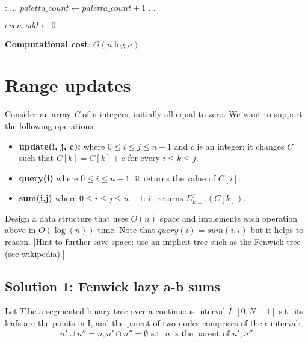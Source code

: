 \documentclass{article}
\begin{document}
\begin{algorithmic}[1]
  :
    \State ...                        
      \State $paletta\_count \gets paletta\_count + 1$
      \State ...
      \EndIf
    \EndFunction
\end{algorithmic}

\begin{algorithmic}[1]
    \State $even, odd \gets 0$
        \State {}\;
      \EndIf
    \EndFor
    \State {}\;
    \EndFunction
\end{algorithmic}

\begin{framed}
  \noindent
  \textbf{Computational cost}: $\Theta(n\log n)$.
\end{framed}


\newpage
\section{Range updates}

Consider an array \emph{C} of n integers, initially all equal to zero.
We want to support the following operations:
\begin{itemize}
    \item \textbf{update(i, j, c):} where $0 \leq i \leq j \leq n - 1$ and $c$ is
    an integer: it changes $C$ such that $C[k] = C[k] + c$ for every $i \leq k \leq j$.
    \item \textbf{query(i)} where $0 \leq i \leq n - 1$: it returns the value of $C[i]$.
    \item \textbf{sum(i,j)} where $0 \leq i \leq j \leq n - 1$: it returns
                    $\Sigma_{k = 1}^{j}(C[k])$.
\end{itemize}

Design a data structure that uses $O(n)$ space and implements each operation above
in $O(\log(n))$ time. Note that $query(i) = sum(i, i)$ but it helps to reason.
[Hint to further save space: use an implicit tree such as the Fenwick tree (see wikipedia).]

\subsection{Solution 1: Fenwick lazy a-b sums}
Let $T$ be a segmented binary tree over a continuous interval $I: [0, N - 1]$
s.t.\ its leafs are the points in I, and the parent of two nodes comprises of their interval:
$$  n' \cup n'' = n, n' \cap n'' = \emptyset   \textrm{ s.t. } n \text{ is the parent of } n', n''$$
\end{document}
